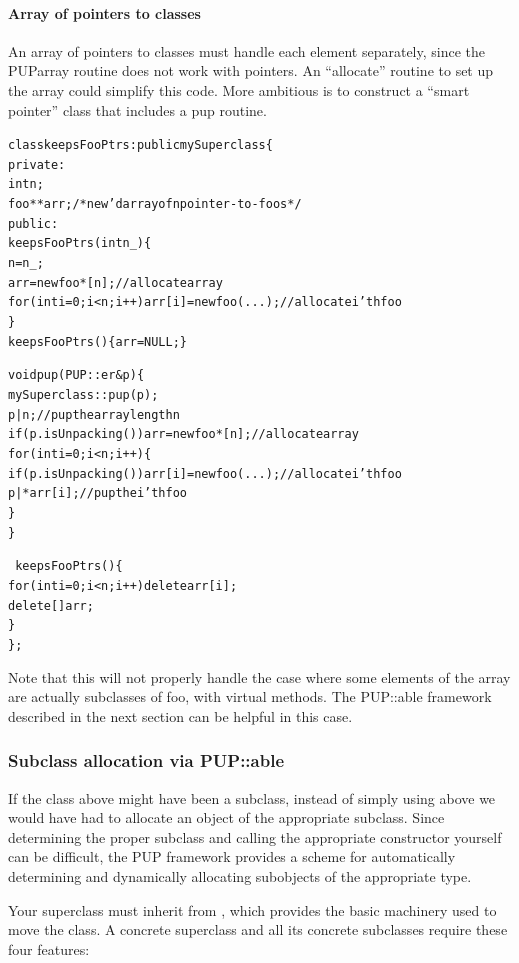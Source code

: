 \paragraph{Array of pointers to classes}
An array of pointers to classes must handle each element
separately, since the PUParray routine does not work with 
pointers.  An ``allocate'' routine to set up the array
could simplify this code.  More ambitious is to construct
a ``smart pointer'' class that includes a pup routine.
\begin{alltt}
class keepsFooPtrs : public mySuperclass \{
private:
    int n;
    foo **arr;/*new'd array of n pointer-to-foos*/
public:
    keepsFooPtrs(int n_) \{
      n=n_;
      arr=new foo*[n]; // allocate array
      for (int i=0;i<n;i++) arr[i]=new foo(...); // allocate i'th foo
    \}
    keepsFooPtrs() \{ arr=NULL; \} 
    
    void pup(PUP::er &p) \{
      mySuperclass::pup(p);
      p|n;//pup the array length n
      if (p.isUnpacking()) arr=new foo*[n]; // allocate array
      for (int i=0;i<n;i++) \{
        if (p.isUnpacking()) arr[i]=new foo(...); // allocate i'th foo
        p|*arr[i];  //pup the i'th foo
      \}
    \}
    
    ~keepsFooPtrs() \{
       for (int i=0;i<n;i++) delete arr[i];
       delete[] arr;
     \}
\};
\end{alltt}

Note that this will not properly handle the case where
some elements of the array are actually subclasses of foo,
with virtual methods.  The PUP::able framework described
in the next section can be helpful in this case.


\subsubsection{Subclass allocation via PUP::able}
\label{sec:pup::able}
If the class  above might have been a subclass, instead of
simply using  above we would have had to allocate 
an object of the appropriate subclass.  Since determining the
proper subclass and calling the appropriate constructor yourself can be 
difficult, the PUP framework provides a scheme for automatically
determining and dynamically allocating subobjects of the appropriate type.

Your superclass must inherit from , which provides 
the basic machinery used to move the class.  
A concrete superclass and all its concrete subclasses require these
four features:

